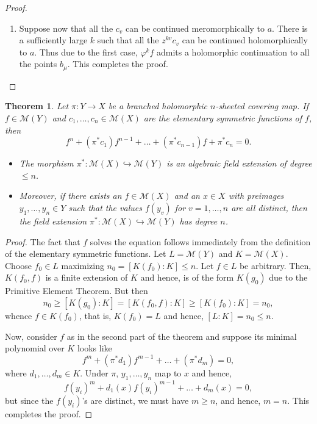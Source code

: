 \documentclass[12pt]{article}
\theoremstyle{thmstyle}
\newtheorem{theorem}{Theorem}[section]
\theoremstyle{defstyle}
\newcommand{\into}{\hookrightarrow}
\renewcommand{\le}{\leqslant}
\renewcommand{\ge}{\geqslant}
\newcommand{\scrM}{\mathscr{M}}
\begin{document}
\begin{proof}
\begin{description}
\begin{enumerate}[label=(\alph*)]
        \item Suppose now that all the $c_v$ can be continued meromorphically to $a$. There is a sufficiently large $k$ such that all the $z^{kv}c_v$ can be continued holomorphically to $a$. Thus due to the first case, $\varphi^k f$ admits a holomorphic continuation to all the points $b_\mu$. This completes the proof. \qedhere
    \end{enumerate}
    \end{description}
\end{proof}

\begin{theorem}
    Let $\pi: Y\to X$ be a branched holomorphic $n$-sheeted covering map. If $f\in\scrM(Y)$ and $c_1,\dots, c_n\in\scrM(X)$ are the elementary symmetric functions of $f$, then 
    \begin{equation*}
        f^n + (\pi^\ast c_1)f^{n - 1} + \dots + (\pi^\ast c_{n - 1})f + \pi^{\ast}c_n = 0.
    \end{equation*}
    \begin{itemize}
        \item The morphism $\pi^\ast:\scrM(X)\into\scrM(Y)$ is an algebraic field extension of degree $\le n$.
        \item Moreover, if there exists an $f\in\scrM(X)$ and an $x\in X$ with preimages $y_1,\dots, y_n\in Y$ such that the values $f(y_v)$ for $v = 1,\dots, n$ are all distinct, then the field extension $\pi^{\ast}:\scrM(X)\into\scrM(Y)$ has degree $n$.
    \end{itemize}
\end{theorem}
\begin{proof}
    The fact that $f$ solves the equation follows immediately from the definition of the elementary symmetric functions. Let $L = \scrM(Y)$ and $K = \scrM(X)$. Choose $f_0\in L$ maximizing $n_0 = [K(f_0) : K]\le n$. Let $f\in L$ be arbitrary. Then, $K(f_0, f)$ is a finite extension of $K$ and hence, is of the form $K(g_0)$ due to the Primitive Element Theorem. But then 
    \begin{equation*}
        n_0\ge [K(g_0) : K] = [K(f_0, f): K]\ge [K(f_0) : K] = n_0,
    \end{equation*}
    whence $f\in K(f_0)$, that is, $K(f_0) = L$ and hence, $[L : K] = n_0\le n$.

    Now, consider $f$ as in the second part of the theorem and suppose its minimal polynomial over $K$ looks like 
    \begin{equation*}
        f^m + (\pi^\ast d_1)f^{m - 1} + \dots + (\pi^\ast d_m) = 0,
    \end{equation*}
    where $d_1,\dots, d_m\in K$. Under $\pi$, $y_1,\dots, y_n$ map to $x$ and hence, 
    \begin{equation*}
        f(y_i)^m + d_1(x)f(y_i)^{m - 1} + \dots + d_m(x) = 0,
    \end{equation*}
    but since the $f(y_i)$'s are distinct, we must have $m\ge n$, and hence, $m = n$. This completes the proof.
\end{proof}
\end{document}
